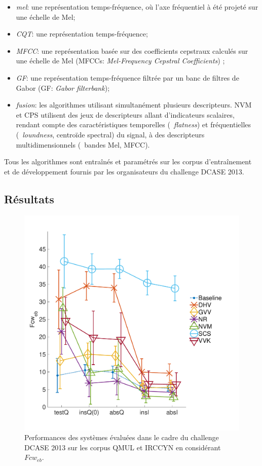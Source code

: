 \begin{itemize}
\item \emph{mel}: une représentation temps-fréquence, où l'axe fréquentiel à été projeté sur une échelle de Mel;
\item \emph{CQT}: une représentation temps-fréquence; %
\item \emph{MFCC}: une représentation basée sur des coefficients cepstraux calculés sur une échelle de Mel (MFCCs: \emph{Mel-Frequency Cepstral Coefficients}) \citep{Davis80a};
\item \emph{GF}: une représentation temps-fréquence filtrée par un banc de filtres de Gabor (GF: \emph{Gabor filterbank});
\item \emph{fusion}: les algorithmes utilisant simultanément plusieurs descripteurs. NVM et CPS utilisent des jeux de descripteurs allant d'indicateurs scalaires, rendant compte des caractéristiques temporelles (\eg~\emph{flatness}) et fréquentielles (\eg~\emph{loundness}, centroïde spectral) du signal, à des descripteurs multidimensionnels (\eg~bandes Mel, MFCC).
\end{itemize}


Tous les algorithmes sont entraînés et paramétrés sur les corpus d'entraînement et de développement fournis par les organisateurs du challenge DCASE 2013. \\

\subsection{Résultats}

\begin{figure}[t]
\includegraphics[width=1\columnwidth]{gfx/ch_7/dcase2013_1}
\caption{Performances des systèmes évaluées dans le cadre du challenge DCASE 2013 sur les corpus QMUL et IRCCYN en considérant $Fcw_{eb}$.}
\label{fig:irccyn}
\end{figure}

